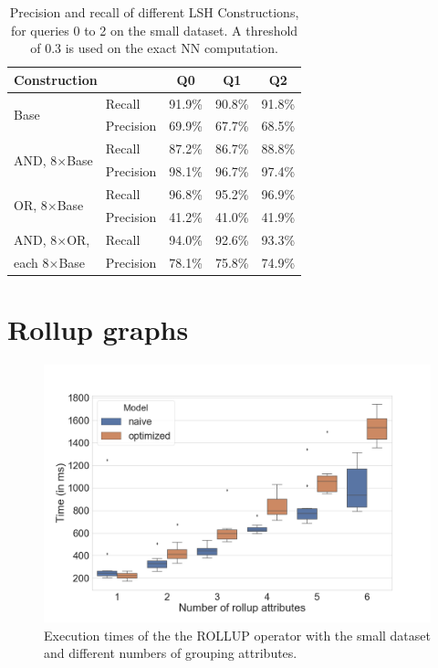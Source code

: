 \documentclass[a4paper,10pt]{IEEEtran}
\begin{document}
\begin{table}
    \centering
    \caption{Precision and recall of different LSH Constructions, for queries 0 to 2 on the small dataset. A threshold of 0.3 is used on the exact NN computation.}
    \begin{tabular}{|l|l||c|c|c|}
      \hline
      \multicolumn{2}{|l||}{Construction} & Q0 & Q1 & Q2 \\
      \hline
      \multirow{2}{*}{Base}               & Recall    & 91.9\% & 90.8\% & 91.8\%\\
                                          & Precision & 69.9\% & 67.7\% & 68.5\%\\
      \hline
      \multirow{2}{*}{AND, 8$\times$Base} & Recall    & 87.2\% & 86.7\% & 88.8\%\\
                                          & Precision & 98.1\% & 96.7\% & 97.4\%\\
      \hline
      \multirow{2}{*}{OR, 8$\times$Base}  & Recall    & 96.8\% & 95.2\% & 96.9\%\\
                                          & Precision & 41.2\% & 41.0\% & 41.9\%\\
      \hline
      AND, 8$\times$OR,                   & Recall    & 94.0\% & 92.6\% & 93.3\%\\
      each 8$\times$Base                  & Precision & 78.1\% & 75.8\% & 74.9\%\\
      \hline
    \end{tabular}
    \label{tab:results}
\end{table}

\newpage

\section*{Rollup graphs}

\begin{figure}[!ht]
    \centering
    \includegraphics[width=\linewidth]{"Rollup_small.png"}
    \caption{Execution times of the the ROLLUP operator with the small dataset and different numbers of grouping attributes.}
    \label{fig:Rollup-small}
\end{figure}
\end{document}
